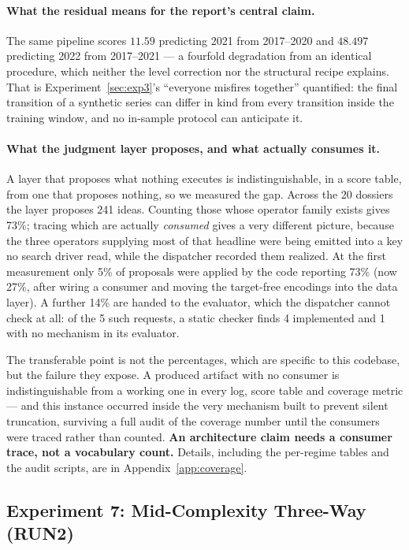 \documentclass[11pt,a4paper]{article}
\begin{document}
\paragraph{What the residual means for the report's central claim.} The same pipeline scores $11.59$ predicting 2021 from 2017--2020 and $48.497$ predicting 2022 from 2017--2021 --- a fourfold degradation from an identical procedure, which neither the level correction nor the structural recipe explains. That is Experiment~\ref{sec:exp3}'s ``everyone misfires together'' quantified: the final transition of a synthetic series can differ in kind from every transition inside the training window, and no in-sample protocol can anticipate it.

\paragraph{What the judgment layer proposes, and what actually consumes it.} A layer that
proposes what nothing executes is indistinguishable, in a score table, from one that proposes
nothing, so we measured the gap. Across the 20 dossiers the layer proposes 241 ideas. Counting
those whose operator family exists gives 73\%; tracing which are actually \emph{consumed} gives
a very different picture, because the three operators supplying most of that headline were being
emitted into a key no search driver read, while the dispatcher recorded them realized. At the
first measurement only 5\% of proposals were applied by the code reporting 73\% (now 27\%, after
wiring a consumer and moving the target-free encodings into the data layer). A further 14\% are
handed to the evaluator, which the dispatcher cannot check at all: of the 5 such requests, a
static checker finds 4 implemented and 1 with no mechanism in its evaluator.

The transferable point is not the percentages, which are specific to this codebase, but the
failure they expose. A produced artifact with no consumer is indistinguishable from a working
one in every log, score table and coverage metric --- and this instance occurred inside the very
mechanism built to prevent silent truncation, surviving a full audit of the coverage number
until the consumers were traced rather than counted. \textbf{An architecture claim needs a
consumer trace, not a vocabulary count.} Details, including the per-regime tables and the audit
scripts, are in Appendix~\ref{app:coverage}.

\subsection{Experiment 7: Mid-Complexity Three-Way (RUN2)}
\label{sec:exp7run2}
\end{document}
